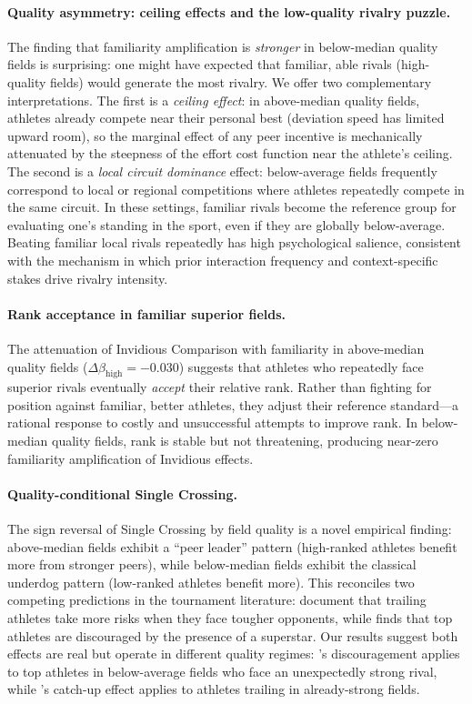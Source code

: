 \documentclass[12pt]{article}
\theoremstyle{definition}
\theoremstyle{remark}
\begin{document}
\paragraph{Quality asymmetry: ceiling effects and the low-quality rivalry puzzle.}
The finding that familiarity amplification is \textit{stronger} in
below-median quality fields is surprising: one might have expected that familiar,
able rivals (high-quality fields) would generate the most rivalry.
We offer two complementary interpretations.
The first is a \textit{ceiling effect}: in above-median quality fields, athletes
already compete near their personal best (deviation speed has limited upward
room), so the marginal effect of any peer incentive is mechanically attenuated
by the steepness of the effort cost function near the athlete's ceiling.
The second is a \textit{local circuit dominance} effect: below-average fields
frequently correspond to local or regional competitions where athletes repeatedly
compete in the same circuit.
In these settings, familiar rivals become the reference group for evaluating
one's standing in the sport, even if they are globally below-average.
Beating familiar local rivals repeatedly has high psychological salience,
consistent with the \citet{KilduffElfenbeinStaw2010} mechanism in which
prior interaction frequency and context-specific stakes drive rivalry intensity.

\paragraph{Rank acceptance in familiar superior fields.}
The attenuation of Invidious Comparison with familiarity in above-median quality
fields ($\Delta\beta_{\text{high}} = -0.030$) suggests that athletes who repeatedly
face superior rivals eventually \textit{accept} their relative rank.
Rather than fighting for position against familiar, better athletes, they adjust
their reference standard---a rational response to costly and unsuccessful attempts
to improve rank.
In below-median quality fields, rank is stable but not threatening, producing
near-zero familiarity amplification of Invidious effects.

\paragraph{Quality-conditional Single Crossing.}
The sign reversal of Single Crossing by field quality is a novel empirical
finding: above-median fields exhibit a ``peer leader'' pattern (high-ranked
athletes benefit more from stronger peers), while below-median fields exhibit
the classical underdog pattern (low-ranked athletes benefit more).
This reconciles two competing predictions in the tournament literature:
\citet{GenakosPageliero2012} document that trailing athletes take more risks
when they face tougher opponents, while \citet{Brown2011} finds that top athletes
are discouraged by the presence of a superstar.
Our results suggest both effects are real but operate in different quality regimes:
\citeauthor{Brown2011}'s discouragement applies to top athletes in below-average
fields who face an unexpectedly strong rival, while \citeauthor{GenakosPageliero2012}'s
catch-up effect applies to athletes trailing in already-strong fields.
\end{document}
